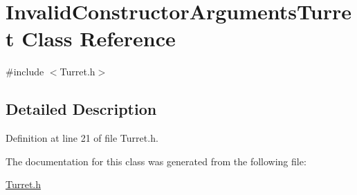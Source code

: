 \hypertarget{classInvalidConstructorArgumentsTurret}{\section{Invalid\-Constructor\-Arguments\-Turret Class Reference}
\label{classInvalidConstructorArgumentsTurret}
}


{\ttfamily \#include $<$Turret.\-h$>$}



\subsection{Detailed Description}


Definition at line 21 of file Turret.\-h.



The documentation for this class was generated from the following file\-:\begin{DoxyCompactItemize}
\item 
\hyperlink{Turret_8h}{Turret.\-h}\end{DoxyCompactItemize}
